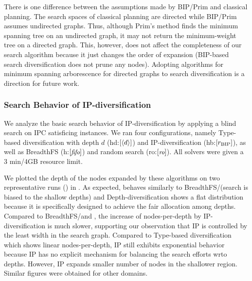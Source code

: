 There is one difference between the assumptions made by BIP/Prim \cite{barabasi1996invasion} and classical planning.
The search spaces of classical planning are directed while BIP/Prim assumes undirected graphs. Thus, although Prim's method finds the minimum spanning tree on an undirected graph, it may not return the minimum-weight tree on a directed graph. This, however, does not affect the completeness of our search algorithm because it just changes the order of expansion (BIP-based search diversification does not prune any nodes).
% 
% 
Adopting algorithms for minimum spanning arborescence for directed graphs \cite{chu1965shortest,edmonds1967optimum,tarjan1977finding,gabow1986efficient} to search diversification is a direction for future work.%


\subsubsection{Search Behavior of IP-diversification}

We analyze the basic search behavior of IP-diversification by applying a blind search on IPC satisficing instances.
We ran four configurations, namely Type-based diversification with depth $d$ (hd:$[{\left<d\right>}]$) and IP-diversification (hb:$[r_\text{BIP}]$), as well as BreadthFS (h:$[{\small\textit{fifo}}]$) and random search (ro:$[{\small\textit{ro}}]$).
All solvers were given a 3 min/4GB resource limit.

We plotted the depth of the nodes expanded by these algorithms on two representative runs () in .
As expected, \ro behaves similarly to BreadthFS/\fifo (search is biased to the shallow depths) and
Depth-diversification shows a flat distribution because it is specifically designed to achieve the fair allocation among depths.
Compared to BreadthFS/\fifo and \ro, the increase of nodes-per-depth by IP-diversification is much slower, supporting our observation that IP is controlled by the least width in the search graph.
Compared to Type-based diversification which shows linear nodes-per-depth, IP still exhibits exponential behavior because IP has no explicit mechanism for balancing  the search  efforts wrto depths. However, IP expands smaller number of nodes in the shallower region.
Similar figures were obtained for other domains.

